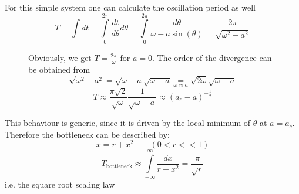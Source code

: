 For this simple system one can calculate the oscillation period as well
\begin{equation*}
	T=\int dt=\int\limits_0^{2\pi} \frac{dt}{d\theta}d\theta=\int\limits_0^{2\pi}\frac{d\theta}{\omega-a\sin(\theta)}=\frac{2\pi}{\sqrt{\omega^2-a^2}}
\end{equation*}
\begin{figure}[H]
	\centering
	\begin{multicols}{2}
		\begin{figure}[H]
			\centering
		\end{figure}\columnbreak
		Obviously, we get $T=\frac{2\pi}{\omega}$ for $a=0$. The order of the divergence can be obtained from
		\begin{equation*}
			\sqrt{\omega^2-a^2}=\sqrt{\omega+a}\sqrt{\omega-a}\underset{\omega\approx a}{=}\sqrt{2\omega}\sqrt{\omega-a}
		\end{equation*}
		\begin{equation*}
			T\approx\frac{\pi\sqrt{2}}{\sqrt{\omega}}\frac{1}{\sqrt{\omega-a}}\approx (a_c-a)^{-\frac{1}{2}}
		\end{equation*}
	\end{multicols}
\end{figure}
This behaviour is generic, since it is driven by the local minimum of $\dot{\theta}$ at $a=a_c$. Therefore the bottleneck can be described by:
\begin{equation*}
	\dot{x}=r+x^2\qquad (0<r<<1)
\end{equation*}
\begin{equation*}
	T_\text{bottleneck}\approx\int\limits_{-\infty}^\infty\frac{dx}{r+x^2}=\frac{\pi}{\sqrt{r}}
\end{equation*}
i.e. the square root scaling law
\begin{figure}[H]
	\centering
\end{figure}
